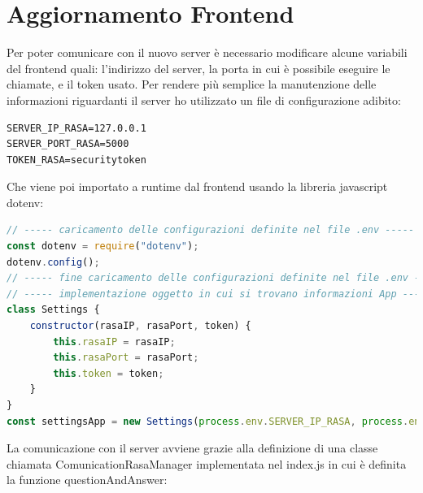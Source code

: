 \section{Aggiornamento Frontend}
Per poter comunicare con il nuovo server è necessario modificare alcune variabili del frontend quali: l'indirizzo del server, la porta in cui è possibile eseguire le chiamate, e il token usato.
Per rendere più semplice la manutenzione delle informazioni riguardanti il server ho utilizzato un file di configurazione adibito:
\begin{lstlisting}
SERVER_IP_RASA=127.0.0.1
SERVER_PORT_RASA=5000
TOKEN_RASA=securitytoken
\end{lstlisting}
Che viene poi importato a runtime dal frontend usando la libreria javascript dotenv:
\begin{lstlisting}[language=JavaScript]
// ----- caricamento delle configurazioni definite nel file .env ----- //
const dotenv = require("dotenv");
dotenv.config();
// ----- fine caricamento delle configurazioni definite nel file .env ----- //
// ----- implementazione oggetto in cui si trovano informazioni App ----- //
class Settings {
    constructor(rasaIP, rasaPort, token) {
        this.rasaIP = rasaIP;
        this.rasaPort = rasaPort;
        this.token = token;
    }
}
const settingsApp = new Settings(process.env.SERVER_IP_RASA, process.env.SERVER_PORT_RASA, process.env.TOKEN_RASA);
\end{lstlisting}
La comunicazione con il server avviene grazie alla definizione di una classe chiamata ComunicationRasaManager implementata nel index.js in cui è definita la funzione questionAndAnswer:
